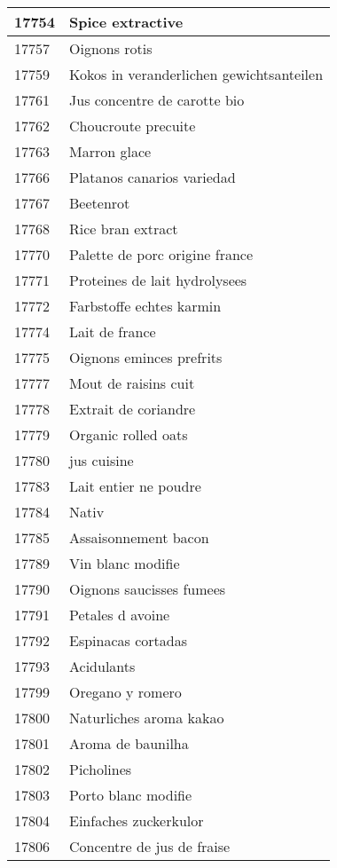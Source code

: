 \begin{longtable}{|l|l|}
17754 & Spice extractive \\ \hline 
17757 & Oignons rotis \\ \hline 
17759 & Kokos in veranderlichen gewichtsanteilen \\ \hline 
17761 & Jus concentre de carotte bio \\ \hline 
17762 & Choucroute precuite \\ \hline 
17763 & Marron glace \\ \hline 
17766 & Platanos canarios variedad \\ \hline 
17767 & Beetenrot \\ \hline 
17768 & Rice bran extract \\ \hline 
17770 & Palette de porc origine france \\ \hline 
17771 & Proteines de lait hydrolysees \\ \hline 
17772 & Farbstoffe echtes karmin \\ \hline 
17774 & Lait de france \\ \hline 
17775 & Oignons eminces prefrits \\ \hline 
17777 & Mout de raisins cuit \\ \hline 
17778 & Extrait de coriandre \\ \hline 
17779 & Organic rolled oats \\ \hline 
17780 & jus cuisine \\ \hline 
17783 & Lait entier ne poudre \\ \hline 
17784 & Nativ \\ \hline 
17785 & Assaisonnement bacon \\ \hline 
17789 & Vin blanc modifie \\ \hline 
17790 & Oignons saucisses fumees \\ \hline 
17791 & Petales d avoine \\ \hline 
17792 & Espinacas cortadas \\ \hline 
17793 & Acidulants \\ \hline 
17799 & Oregano y romero \\ \hline 
17800 & Naturliches aroma kakao \\ \hline 
17801 & Aroma de baunilha \\ \hline 
17802 & Picholines \\ \hline 
17803 & Porto blanc modifie \\ \hline 
17804 & Einfaches zuckerkulor \\ \hline 
17806 & Concentre de jus de fraise \\ \hline 

\end{longtable}
